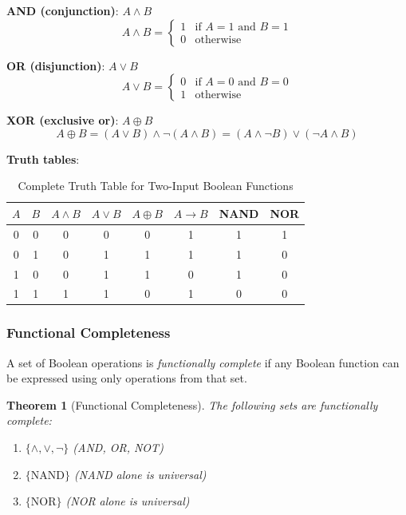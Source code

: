 \documentclass[11pt,a4paper]{article}
\newtheorem{theorem}{Theorem}[section]
\begin{document}
\textbf{AND (conjunction)}: $A \land B$
\begin{equation}
A \land B = \begin{cases} 1 & \text{if } A = 1 \text{ and } B = 1 \\ 0 & \text{otherwise} \end{cases}
\end{equation}

\textbf{OR (disjunction)}: $A \lor B$
\begin{equation}
A \lor B = \begin{cases} 0 & \text{if } A = 0 \text{ and } B = 0 \\ 1 & \text{otherwise} \end{cases}
\end{equation}

\textbf{XOR (exclusive or)}: $A \oplus B$
\begin{equation}
A \oplus B = (A \lor B) \land \neg(A \land B) = (A \land \neg B) \lor (\neg A \land B)
\end{equation}

\textbf{Truth tables}:

\begin{table}[H]
\centering
\caption{Complete Truth Table for Two-Input Boolean Functions}
\begin{tabular}{cc|cccccc}
\toprule
$A$ & $B$ & $A \land B$ & $A \lor B$ & $A \oplus B$ & $A \rightarrow B$ & NAND & NOR \\
\midrule
0 & 0 & 0 & 0 & 0 & 1 & 1 & 1 \\
0 & 1 & 0 & 1 & 1 & 1 & 1 & 0 \\
1 & 0 & 0 & 1 & 1 & 0 & 1 & 0 \\
1 & 1 & 1 & 1 & 0 & 1 & 0 & 0 \\
\bottomrule
\end{tabular}
\end{table}

\subsubsection{Functional Completeness}

A set of Boolean operations is \textit{functionally complete} if any Boolean function can be expressed using only operations from that set\cite{shannon1938symbolic}.

\begin{theorem}[Functional Completeness]
The following sets are functionally complete:
\begin{enumerate}
\item $\{\land, \lor, \neg\}$ (AND, OR, NOT)
\item $\{\text{NAND}\}$ (NAND alone is universal)
\item $\{\text{NOR}\}$ (NOR alone is universal)
\end{enumerate}
\end{theorem}
\end{document}
